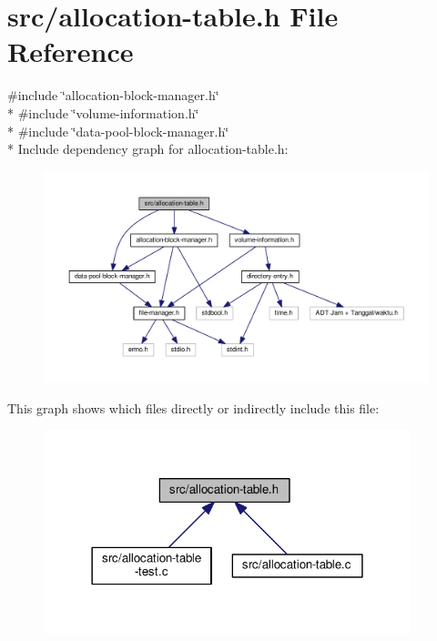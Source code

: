 \hypertarget{allocation-table_8h}{\section{src/allocation-\/table.h File Reference}
\label{allocation-table_8h}
}
{\ttfamily \#include \char`\"{}allocation-\/block-\/manager.\-h\char`\"{}}\\*
{\ttfamily \#include \char`\"{}volume-\/information.\-h\char`\"{}}\\*
{\ttfamily \#include \char`\"{}data-\/pool-\/block-\/manager.\-h\char`\"{}}\\*
Include dependency graph for allocation-\/table.h\-:
\nopagebreak
\begin{figure}[H]
\begin{center}
\leavevmode
\includegraphics[width=350pt]{allocation-table_8h__incl}
\end{center}
\end{figure}
This graph shows which files directly or indirectly include this file\-:
\nopagebreak
\begin{figure}[H]
\begin{center}
\leavevmode
\includegraphics[width=302pt]{allocation-table_8h__dep__incl}
\end{center}
\end{figure}
